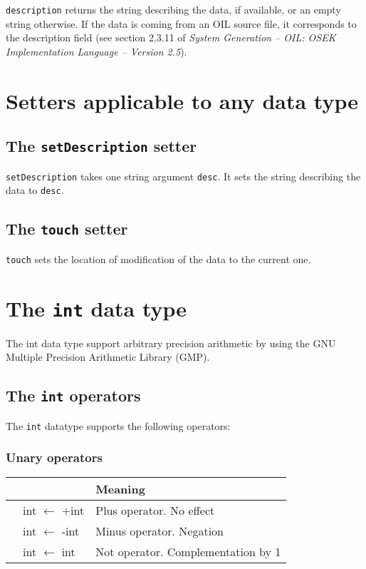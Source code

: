 \documentclass[10pt,openright,twosides,final]{memoir}
\newcommand{\gtltype}[1]{{\small\ttfamily #1}}
\newcommand{\gtlinline}[1]{\colorbox{light-blue}{\lstinline[language=gtl]{#1}}}
\begin{document}
\gtlinline{description} returns the string describing the data, if available, or an empty string otherwise. If the data is coming from an OIL source file, it corresponds to the description field (see section 2.3.11 of \emph{System Generation -- OIL: OSEK Implementation Language -- Version 2.5}).

\section{Setters applicable to any data type}

\subsection{The \texttt{setDescription} setter} 
\label{sec:setDescription}

\gtlinline{setDescription} takes one string argument \lstinline[language=gtl]{desc}. It sets the string describing the data to \lstinline[language=gtl]{desc}.

\subsection{The \texttt{touch} setter} 
\label{sec:touch}

\gtlinline{touch} sets the location of modification of the data to the current one.

\section{The \texttt{int} data type}

The \gtltype{int} data type support arbitrary precision arithmetic by using the GNU Multiple Precision Arithmetic Library (GMP).

\subsection{The \texttt{int} operators}

The \lstinline{int} datatype supports the following operators:

\subsubsection{Unary operators}

\begin{longtable}{>{\ttfamily}l|>{\ttfamily}l|l}
{\bfseries Operator}&{\bfseries Expression type}&{\bfseries Meaning}\\
\hline\endhead
 {+}&
  {int $\leftarrow$ +int}&
  {Plus operator. No effect}\\
 {-}&
  {int $\leftarrow$ -int}&
  {Minus operator. Negation}\\
 {\raisebox{-1.2mm}{\textasciitilde}}&
  {int $\leftarrow$ \raisebox{-1.2mm}{\textasciitilde}int}&
  {Not operator. Complementation by 1}\\
\end{longtable}
\end{document}
